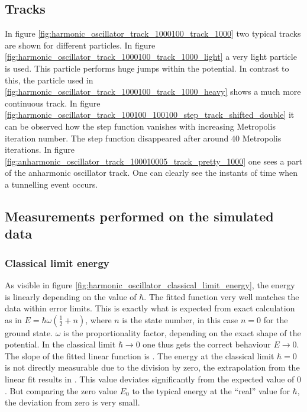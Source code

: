 \documentclass{scrartcl}
\begin{document}
	\subsection{Tracks}
		In figure \ref{fig:harmonic_oscillator_track_1000100_track_1000} two typical tracks are shown for different particles.
		In figure \ref{fig:harmonic_oscillator_track_1000100_track_1000_light} a very light particle is used.
		This particle performs huge jumps within the potential.
		In contrast to this, the particle used in \ref{fig:harmonic_oscillator_track_1000100_track_1000_heavy} shows a much more continuous track.
		In figure \ref{fig:harmonic_oscillator_track_100100_100100_step_track_shifted_double} it can be observed how the step function vanishes with increasing Metropolis iteration number.
		The step function disappeared after around 40 Metropolis iterations.
		In figure \ref{fig:anharmonic_oscillator_track_100010005_track_pretty_1000} one sees a part of the anharmonic oscillator track.
		One can clearly see the instants of time when a tunnelling event occurs.

	\subsection{Measurements performed on the simulated data}
	\subsubsection{Classical limit energy}
		As visible in figure \ref{fig:harmonic_oscillator_classical_limit_energy}, the energy is linearly depending on the value of $\hbar$.
		The fitted function very well matches the data within error limits.
		This is exactly what is expected from exact calculation as in $E = \hbar \omega \left(\frac 12 + n\right)$, where $n$ is the state number, in this case $n = 0$ for the ground state.
		$\omega$ is the proportionality factor, depending on the exact shape of the potential.
		In the classical limit $\hbar \rightarrow 0$ one thus gets the correct behaviour $E \rightarrow 0$.
		The slope of the fitted linear function is \unskip.
		The energy at the classical limit $\hbar = 0$ is not directly measurable due to the division by zero, the extrapolation from the linear fit results in \unskip.
		This value deviates significantly from the expected value of $0$.
		But comparing the zero value $E_0$ to the typical energy at the \enquote{real} value for $\hbar$, the deviation from zero is very small.
\end{document}
